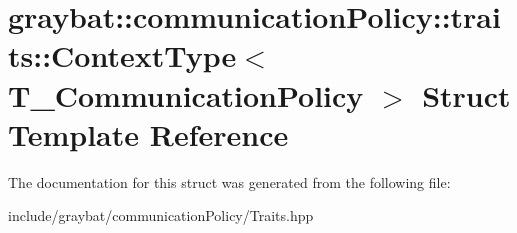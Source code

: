 \hypertarget{structgraybat_1_1communicationPolicy_1_1traits_1_1ContextType}{}\section{graybat\+:\+:communication\+Policy\+:\+:traits\+:\+:Context\+Type$<$ T\+\_\+\+Communication\+Policy $>$ Struct Template Reference}
\label{structgraybat_1_1communicationPolicy_1_1traits_1_1ContextType}


The documentation for this struct was generated from the following file\+:\begin{DoxyCompactItemize}
\item 
include/graybat/communication\+Policy/Traits.\+hpp\end{DoxyCompactItemize}
